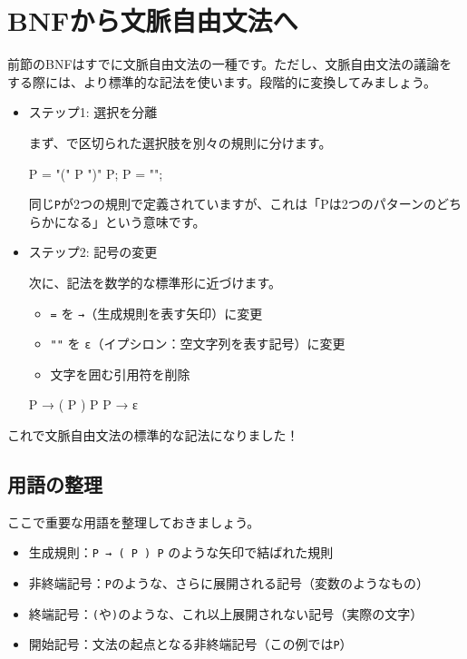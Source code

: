 \section{BNFから文脈自由文法へ}

前節のBNFはすでに文脈自由文法の一種です。ただし、文脈自由文法の議論をする際には、より標準的な記法を使います。段階的に変換してみましょう。

\begin{itemize}
\item
  ステップ1: 選択を分離

まず、\texttt{\textbar{}}で区切られた選択肢を別々の規則に分けます。

\begin{codescreen}{}
P = "(" P ")" P;
P = "";
\end{codescreen}

同じ\texttt{P}が2つの規則で定義されていますが、これは「Pは2つのパターンのどちらかになる」という意味です。

\item
  ステップ2: 記号の変更

次に、記法を数学的な標準形に近づけます。

\begin{itemize}
\item
  \texttt{=} を \texttt{→}（生成規則を表す矢印）に変更
\item
  \texttt{""} を \texttt{ε}（イプシロン：空文字列を表す記号）に変更
\item
  文字を囲む引用符を削除
\end{itemize}

\begin{codescreen}{}
P → ( P ) P
P → ε
\end{codescreen}
\end{itemize}

これで文脈自由文法の標準的な記法になりました！

\subsection{用語の整理}

ここで重要な用語を整理しておきましょう。

\begin{itemize}
\item
  生成規則：\texttt{P\ →\ (\ P\ )\ P} のような矢印で結ばれた規則
\item
  非終端記号：\texttt{P}のような、さらに展開される記号（変数のようなもの）
\item
  終端記号：\texttt{(}や\texttt{)}のような、これ以上展開されない記号（実際の文字）
\item
  開始記号：文法の起点となる非終端記号（この例では\texttt{P}）
\end{itemize}

